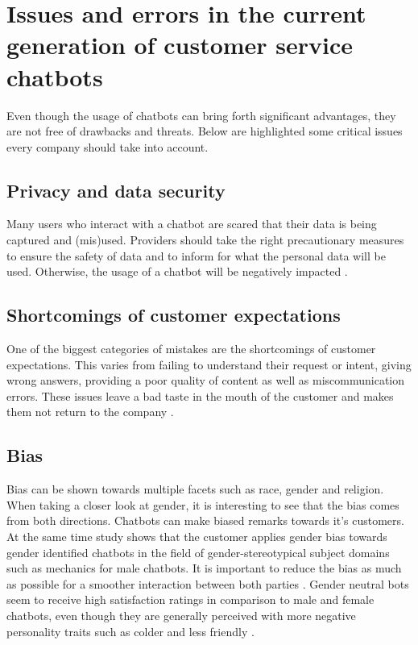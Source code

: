 \section{Issues and errors in the current generation of customer service chatbots}
Even though the usage of chatbots can bring forth significant advantages, they are not free of drawbacks and threats. Below are highlighted some critical issues every company should take into account.

\subsection{Privacy and data security}
Many users who interact with a chatbot are scared that their data is being captured and (mis)used. Providers should take the right precautionary measures to ensure the safety of data and to inform for what the personal data will be used. Otherwise, the usage of a chatbot will be negatively impacted \citep*{Adamopoulou2020, Duka2021, Rese2020}.

\subsection{Shortcomings of customer expectations}
One of the biggest categories of mistakes are the shortcomings of customer expectations. This varies from failing to understand their request or intent, giving wrong answers, providing a poor quality of content as well as miscommunication errors. These issues leave a bad taste in the mouth of the customer and makes them not return to the company \citep*{Adamopoulou2020, Duka2021, Nichifor2021, Sheehan2020, Margot}.

\subsection{Bias}
Bias can be shown towards multiple facets such as race, gender and religion. When taking a closer look at gender, it is interesting to see that the bias comes from both directions. Chatbots can make biased remarks towards it's customers. At the same time study shows that the customer applies gender bias towards gender identified chatbots in the field of gender-stereotypical subject domains such as mechanics for male chatbots. It is important to reduce the bias as much as possible for a smoother interaction between both parties \citep*{Adamopoulou2020, McDonnell2019}. Gender neutral bots seem to receive high satisfaction ratings in comparison to male and female chatbots, even though they are generally perceived with more negative personality traits such as colder and less friendly \citep{McDonnell2019}.

